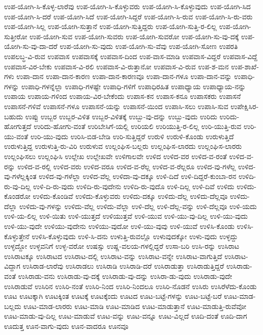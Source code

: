 {ಉಪ-ಯೋಗಿ-ಸಿ-ಕೊಳ್ಳ-ಲಾರೆವು
ಉಪ-ಯೋಗಿ-ಸಿ-ಕೊಳ್ಳುವರು
ಉಪ-ಯೋಗಿ-ಸಿ-ಕೊಳ್ಳುವುದು
ಉಪ-ಯೋಗಿ-ಸಿದ
ಉಪ-ಯೋಗಿ-ಸಿ-ದರೆ
ಉಪ-ಯೋಗಿ-ಸಿದೆ
ಉಪ-ಯೋಗಿ-ಸಿದ್ದರೆ
ಉಪ-ಯೋಗಿ-ಸಿ-ರುವ
ಉಪ-ಯೋಗಿ-ಸಿ-ರು-ವರು
ಉಪ-ಯೋಗಿ-ಸಿಲ್ಲ
ಉಪ-ಯೋಗಿ-ಸುತ್ತಾನೆ
ಉಪ-ಯೋಗಿ-ಸುತ್ತಿದ್ದರು
ಉಪ-ಯೋಗಿ-ಸುತ್ತಿ-ರ-ಲಿಲ್ಲ
ಉಪ-ಯೋಗಿ-ಸುತ್ತೀರೋ
ಉಪ-ಯೋಗಿ-ಸುವ
ಉಪ-ಯೋಗಿ-ಸುವರು
ಉಪ-ಯೋಗಿ-ಸುವರೋ
ಉಪ-ಯೋಗಿ-ಸು-ವು-ದಕ್ಕೆ
ಉಪ-ಯೋಗಿ-ಸು-ವು-ದಾ-ದರೆ
ಉಪ-ಯೋಗಿ-ಸು-ವುದು
ಉಪ-ಯೋಗಿ-ಸು-ವೆವು
ಉಪ-ಯೋಗಿ-ಸೋಣ
ಉಪರತಿ
ಉಪಲಬ್ಧ-ವಿ-ರುವ
ಉಪವಾಸ
ಉಪವಾಸಕ್ಕೆ
ಉಪವಾಸ-ದಿಂದ
ಉಪ-ವಾಸ-ಮಾಡಿ
ಉಪವಾಸ-ವಿದ್ದರೆ
ಉಪವಾಸ-ವಿದ್ದೆ
ಉಪವಾಸ-ವಿರ-ಬೇಕು
ಉಪವಾಸ-ವಿ-ರಲಿ
ಉಪವಾಸ-ವಿ-ರುತ್ತಾನೋ
ಉಪವಾಸ-ವಿ-ರುವ
ಉಪ-ಶ-ಮನ
ಉಪ-ಶಾಖೆ-ಗಳು
ಉಪಾ-ದಾನ
ಉಪಾ-ದಾನ-ಕಾರಣ
ಉಪಾ-ದಾನ-ಕಾರಣವೂ
ಉಪಾ-ದಾನ-ಗಳೂ
ಉಪಾ-ದಾನ-ವನ್ನು
ಉಪಾಧಿ-ಗಳನ್ನು
ಉಪಾಧಿ-ಗಳನ್ನೆಲ್ಲಾ
ಉಪಾಧಿ-ಗಳಷ್ಟೇ
ಉಪಾಧಿ-ಗಳಿಗೆ
ಉಪಾಧಿರಹಿತ
ಉಪಾಧ್ಯಾಯ
ಉಪಾಧ್ಯಾಯ-ನನ್ನು
ಉಪಾಯ
ಉಪಾಯ-ಗಳಿಂದ
ಉಪಾಯ-ವಿರ-ಬೇಕೆಂದು
ಉಪಾಸ-ಕನ
ಉಪಾಸ-ಕನೂ
ಉಪಾಸಕರು
ಉಪಾಸನೆ
ಉಪಾಸನೆ-ಗಳಿವೆ
ಉಪಾಸನೆ-ಗಳೂ
ಉಪಾಸನೆ-ಯನ್ನು
ಉಪಾಸನೆ-ಯಿಂದ
ಉಪಾಸಿ-ಸಲು
ಉಪಾಸಿ-ಸುವ
ಉಪೇಕ್ಷಿಸಿರ-ಬಹುದು
ಉಪ್ಪು
ಉಬ್ಬರ
ಉಬ್ಬರ-ವಿಳಿತ
ಉಬ್ಬರ-ವಿಳಿತಕ್ಕೆ
ಉಬ್ಬು-ವು-ದನ್ನು
ಉಬ್ಬು-ವುದು
ಉರಿದು
ಉರಿದು-ಹೋಗುತ್ತದೆ
ಉರಿದು-ಹೋಗು-ವಂತೆ
ಉರಿಬೇಸಿಗೆ-ಯಲ್ಲಿ
ಉರಿಯಲಿ
ಉರಿಯುತ್ತಿ-ರ-ಲಿಲ್ಲ
ಉರಿ-ಯುತ್ತಿ-ರುವ
ಉರಿ-ಯು-ವಂತೆ
ಉರಿ-ಯು-ವುದು
ಉರಿಸಿ-ಬಿಡ-ಬೇಡಿ
ಉರಿ-ಸುತ್ತಿದ್ದರೆ
ಉರುಳಿ
ಉರುಳಿ-ಕೊಂಡು
ಉರುಳುತ್ತಿದೆ
ಉರುಳುತ್ತಿದ್ದ
ಉರುಳುತ್ತಿ-ರು-ವಿರಿ
ಉರುಳುವ
ಉಲ್ಲಂಘಿಸ-ಬಲ್ಲರು
ಉಲ್ಲಂಘಿಸ-ಲಾರದು
ಉಲ್ಲಂಘಿಸ-ಲಾರರು
ಉಲ್ಲಂಘಿಸಲು
ಉಲ್ಲಂಘಿಸಿ
ಉಲ್ಲೇಖ
ಉಲ್ಲೇಖವೇ
ಉಳಿಗಾಲವೇ
ಉಳಿದ
ಉಳಿದ-ವರ
ಉಳಿದ-ವ-ರಂತೆ
ಉಳಿದ-ವ-ರನ್ನು
ಉಳಿದ-ವ-ರಲ್ಲಿ
ಉಳಿದ-ವರು
ಉಳಿದ-ವರೂ
ಉಳಿದ-ವ-ರೆಲ್ಲ
ಉಳಿದ-ವ-ರೆಲ್ಲರೂ
ಉಳಿದ-ವು-ಗಳೆಲ್ಲ
ಉಳಿದ-ವು-ಗಳೆಲ್ಲಕ್ಕಿಂತ
ಉಳಿದ-ವು-ಗಳೆಲ್ಲಾ
ಉಳಿದ-ವೆಲ್ಲ
ಉಳಿದಾ-ವು-ದಕ್ಕೂ
ಉಳಿ-ದಿದೆ
ಉಳಿ-ದಿದ್ದರೆ-ಕುಂಬಾ-ರನ
ಉಳಿದಿ-ರು-ವು-ದಿಲ್ಲ
ಉಳಿ-ದಿ-ರು-ವುದು
ಉಳಿದಿ-ರು-ವುದೇನು
ಉಳಿದಿ-ರು-ವುದೊ
ಉಳಿ-ದಿಲ್ಲ
ಉಳಿ-ದಿವೆ
ಉಳಿದು
ಉಳಿದು-ಕೊಂಡರೋ
ಉಳಿದು-ಕೊಂಡಿವೆ
ಉಳಿದು-ಕೊಳ್ಳುವರು
ಉಳಿದು-ದಕ್ಕೂ
ಉಳಿದು-ದೆಲ್ಲ
ಉಳಿದು-ದೆಲ್ಲವೂ
ಉಳಿದು-ದೆಲ್ಲಾ
ಉಳಿದು-ವು-ಗಳನ್ನು
ಉಳಿದು-ವೆಲ್ಲ
ಉಳಿದು-ವೆಲ್ಲಾ
ಉಳಿ-ದೆಲ್ಲ
ಉಳಿ-ದೆಲ್ಲ-ವನ್ನು
ಉಳಿ-ದೆಲ್ಲವೂ
ಉಳಿ-ಯದು
ಉಳಿ-ಯ-ಲಿಲ್ಲ
ಉಳಿ-ಯಿತು
ಉಳಿ-ಯುತ್ತದೆ
ಉಳಿಯುತ್ತವೆ
ಉಳಿ-ಯುವ
ಉಳಿ-ಯು-ವು-ದಿಲ್ಲ
ಉಳಿ-ಯು-ವುದು
ಉಳಿ-ಯು-ವುದೇ
ಉಳಿಯು-ವುದೇನು
ಉಳಿಯು-ವುದೋ
ಉಳಿ-ಯು-ವುವು
ಉಳಿ-ಯುವೆ
ಉಳಿಸಿ-ಕೊಂಡು
ಉಳಿಸಿ-ಕೊಳ್ಳುತ್ತೇನೆ
ಉಳಿಸಿ-ಕೊಳ್ಳುವುದು
ಉಳಿ-ಸಿ-ದನು
ಉಳುತ್ತಿ-ರುವಲ್ಲೊ
ಉಳುವುದಕ್ಕೋ
ಉಳು-ವುದು
ಉಳ್ಳದ್ದು
ಉಳ್ಳದ್ದೋ
ಉಳ್ಳವನಿಗೆ
ಉಳ್ಳ-ವರೋ
ಉಷಸ್ಸು
ಉಷ್ಣ-ವಲಯ-ಗಳಲ್ಲಿದ್ದರೆ
ಉಸಾ-ಬರಿ
ಉಸಿ-ರನ್ನು
ಉಸಿರಾಟ
ಉಸಿರಾಟಕ್ಕೂ
ಉಸಿರಾಟದ
ಉಸಿರಾಟ-ದಲ್ಲಿ
ಉಸಿರಾಟ-ವನ್ನು
ಉಸಿರಾಟ-ವನ್ನೇ
ಉಸಿರಾಟ-ವಾಗುತ್ತಿದೆ
ಉಸಿರಾಟ-ವಿದ್ದಾಗ
ಉಸಿರಾಡ-ಲಾರೆವು
ಉಸಿರಾಡಲು
ಉಸಿರಾಡಿ
ಉಸಿರಾಡಿ-ದರೆ
ಉಸಿರಾಡುತ್ತಾ
ಉಸಿರಾಡುತ್ತಿದ್ದರೆ
ಉಸಿರಾಡು-ವಂತೆ
ಉಸಿರಾಡು-ವನು
ಉಸಿರಾಡು-ವು-ದಕ್ಕೆ
ಉಸಿರಾಡು-ವು-ದನ್ನು
ಉಸಿರಾ-ಡು-ವುದು
ಉಸಿರಾಡು-ವುದೇ
ಉಸಿರಾಡುವೆ
ಉಸಿರಿನ
ಉಸಿರಿ-ನಂತೆ
ಉಸಿರಿ-ನಿಂದ
ಉಸಿರಿ-ನಿಂದಲೂ
ಉಸಿರಿ-ನೊಡನೆ
ಉಸಿರು
ಉಸಿರೆಳೆದು-ಕೊಂಡು
ಊಟ
ಊಟಕ್ಕಾಗಿ
ಊಟಕ್ಕಿಂತ
ಊಟಕ್ಕೆ
ಊಟಕ್ಕೆಂದು
ಊಟದ
ಊಟ-ಬಟ್ಟೆ-ಗಳನ್ನು
ಊಟ-ಬಟ್ಟೆ-ಬರೆ
ಊಟ-ಮಾಡ-ಬಲ್ಲದು
ಊಟ-ಮಾಡ-ಲಾರರು
ಊಟ-ಮಾಡಿ
ಊಟ-ಮಾಡಿದ
ಊಟ-ಮಾಡುತ್ತಾನೆ
ಊಟ-ಮಾಡುತ್ತಿ-ರುವೆವೋ
ಊಟ-ಮಾಡು-ವು-ದಿಲ್ಲ
ಊಟ-ಮಾಡುವೆ
ಊಟ-ವನ್ನು
ಊಟ-ವನ್ನೂ
ಊಟ-ವಿಲ್ಲದೆ
ಊದಿ-ದಂತೆ
ಊದಿ-ದಾಗ
ಊದುತ್ತ
ಊನ-ವಾಗು-ವುದು
ಊನ-ವಾದರೂ
ಊನವೂ
}
